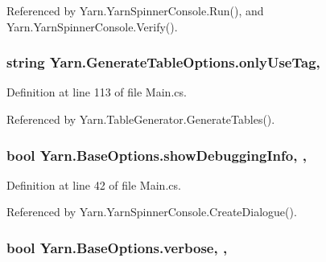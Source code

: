 Referenced by Yarn.\-Yarn\-Spinner\-Console.\-Run(), and Yarn.\-Yarn\-Spinner\-Console.\-Verify().

\hypertarget{a00104_a8b30c1b7fb1b74eae455a568c1024b3d}{
\subsubsection[{only\-Use\-Tag}]{\setlength{\rightskip}{0pt plus 5cm}string Yarn.\-Generate\-Table\-Options.\-only\-Use\-Tag\hspace{0.3cm}{\ttfamily [get]}, {\ttfamily [set]}}}\label{a00104_a8b30c1b7fb1b74eae455a568c1024b3d}


Definition at line 113 of file Main.\-cs.



Referenced by Yarn.\-Table\-Generator.\-Generate\-Tables().

\hypertarget{a00042_a89964ea17bd19caf00cb5bff563ed01c}{
\subsubsection[{show\-Debugging\-Info}]{\setlength{\rightskip}{0pt plus 5cm}bool Yarn.\-Base\-Options.\-show\-Debugging\-Info\hspace{0.3cm}{\ttfamily [get]}, {\ttfamily [set]}, {\ttfamily [inherited]}}}\label{a00042_a89964ea17bd19caf00cb5bff563ed01c}


Definition at line 42 of file Main.\-cs.



Referenced by Yarn.\-Yarn\-Spinner\-Console.\-Create\-Dialogue().

\hypertarget{a00042_ada4d83d1756918f362d55f6649b82b17}{
\subsubsection[{verbose}]{\setlength{\rightskip}{0pt plus 5cm}bool Yarn.\-Base\-Options.\-verbose\hspace{0.3cm}{\ttfamily [get]}, {\ttfamily [set]}, {\ttfamily [inherited]}}}\label{a00042_ada4d83d1756918f362d55f6649b82b17}


